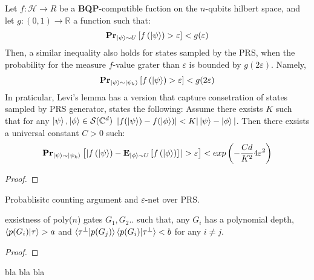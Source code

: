 \documentclass[manuscript,screen,review]{acmart}
\begin{document}
\begin{claim}
  Let $f : \mathcal{H} \rightarrow R$ be a \textbf{BQP}-computible fuction on the $n$-qubits hilbert space, and let $g: (0,1) \rightarrow \mathbb{R} $ a function such that:     
  \begin{equation*}
    \begin{split}
      \prbm{f\left(\ket{\psi} \right) > \varepsilon}{ \ket{\psi} \sim U} < g(\varepsilon)
    \end{split}
  \end{equation*}
  Then, a similar inequality also holds for states sampled by the PRS, when the probability for the measure $f$-value grater than $\varepsilon$ is bounded by $g(2\varepsilon)$. Namely,  
\begin{equation*}
    \begin{split}
      \prbm{f\left(\ket{\psi} \right) > \varepsilon}{ \ket{\psi} \sim \ket{\psi_{k}} } < g(2\varepsilon)
    \end{split}
  \end{equation*}
  In praticular, Levi's lemma has a version that capture consetration of states sampled by PRS generator, states the following: Assume there exsists $K$ such that for any $\ket{\psi},\ket{\phi} \in \mathcal{S}(\mathbb{C}^{d})$ $|f(\ket{\psi}) - f(\ket{\phi})| < K | \ket{\psi} - \ket{\phi}|$. Then there exsists a universal constant $C > 0$ such: 
\begin{equation*}
    \begin{split}
      \prbm{ |f\left(\ket{\psi} \right) - \exppm{f\left(\ket{\phi}\right)}{\ket{\phi} \sim U}| > \varepsilon}{ \ket{\psi} \sim \ket{\psi_{k}} } < exp\left(-\frac{Cd}{K^{2}}  4\varepsilon^{2} \right)
    \end{split}
  \end{equation*}
\end{claim}

\begin{proof}
  
\end{proof}

\begin{claim}
  Probablisitc counting argument and $\varepsilon$-net over PRS. 
\end{claim}

\begin{claim}
  exsistness of poly($n$) gates $G_{1}, G_{2} ..$ such that, any $G_{i}$ has a polynomial depth, $\braket{p(G_{i})|\tau} > a$ and $\braket{\tau^{\perp}|p(G_{j})}\braket{p(G_{i})|\tau^{\perp}} < b$ for any $i\neq j$. 
\end{claim}
\begin{proof}
  
\end{proof}
\begin{claim}
 bla bla bla 
\end{claim}
\end{document}
